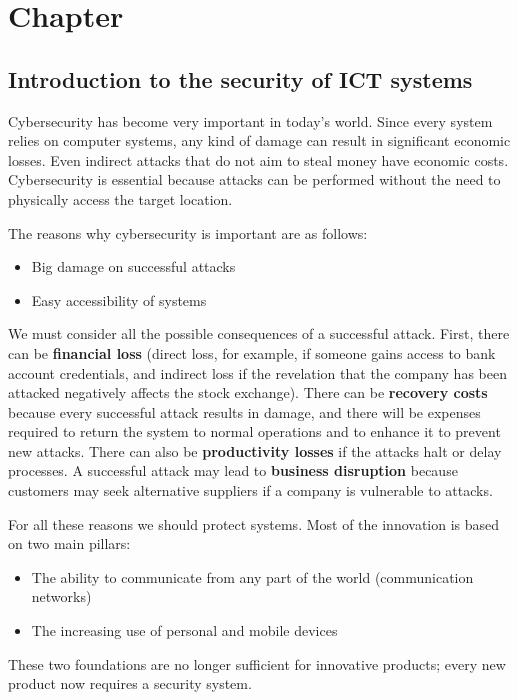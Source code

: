 \chapter{Chapter}

\section{Introduction to the security of ICT systems}
Cybersecurity has become very important in today's world. Since every system relies on computer systems, any kind of damage can result in significant economic losses. Even indirect attacks that do not aim to steal money have economic costs. Cybersecurity is essential because attacks can be performed without the need to physically access the target location.


The reasons why cybersecurity is important are as follows:
\begin{itemize}
\item Big damage on successful attacks
\item Easy accessibility of systems
\end{itemize}

We must consider all the possible consequences of a successful attack. First, there can be \textbf{financial loss} (direct loss, for example, if someone gains access to bank account credentials, and indirect loss if the revelation that the company has been attacked negatively affects the stock exchange). There can be \textbf{recovery costs} because every successful attack results in damage, and there will be expenses required to return the system to normal operations and to enhance it to prevent new attacks. There can also be \textbf{productivity losses} if the attacks halt or delay processes. A successful attack may lead to \textbf{business disruption} because customers may seek alternative suppliers if a company is vulnerable to attacks.


For all these reasons we should protect systems. Most of the innovation is based on two main pillars:
\begin{itemize}
    \item The ability to communicate from any part of the world (communication networks)
    \item The increasing use of personal and mobile devices
\end{itemize}
These two foundations are no longer sufficient for innovative products; every new product now requires a security system.


